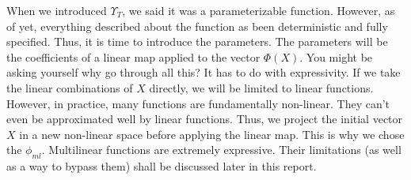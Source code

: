 \documentclass{article}
\theoremstyle{definition}
\theoremstyle{definition}
\begin{document}
When we introduced $\Upsilon_{T}$, we said it was a parameterizable function. However, as of yet, everything described about the function as been deterministic and fully specified. Thus, it is time to introduce the parameters. The parameters will be the coefficients of a linear map applied to the vector $\Phi(X)$. You might be asking yourself why go through all this? It has to do with expressivity. If we take the linear combinations of $X$ directly, we will be limited to linear functions. However, in practice, many functions are fundamentally non-linear. They can't even be approximated well by linear functions. Thus, we project the initial vector $X$ in a new non-linear space before applying the linear map. This is why we chose the $\phi_{ml}$. Multilinear functions are extremely expressive. Their limitations (as well as a way to bypass them) shall be discussed later in this report. \\ 
\end{document}
